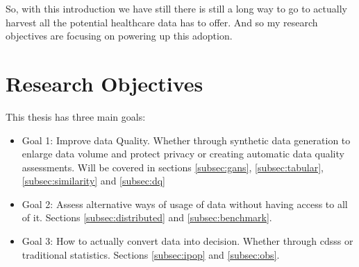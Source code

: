 So, with this introduction we have still there is still a long way to go to actually harvest all the potential healthcare data has to offer. And so my research objectives are focusing on powering up this adoption.
\section{Research Objectives}
This thesis has three main goals:
%









\begin{itemize}
    \item Goal 1: Improve data Quality. Whether through synthetic data generation to enlarge data volume and protect privacy or creating automatic data quality assessments. Will be covered in sections \ref{subsec:gans}, \ref{subsec:tabular}, \ref{subsec:similarity} and \ref{subsec:dq}

    \item Goal 2: Assess alternative ways of usage of data without having access to all of it. Sections \ref{subsec:distributed} and \ref{subsec:benchmark}.

    \item Goal 3: How to actually convert data into decision. Whether through \acp{cdss} or traditional statistics. Sections \ref{subsec:ipop} and \ref{subsec:obs}.
\end{itemize}